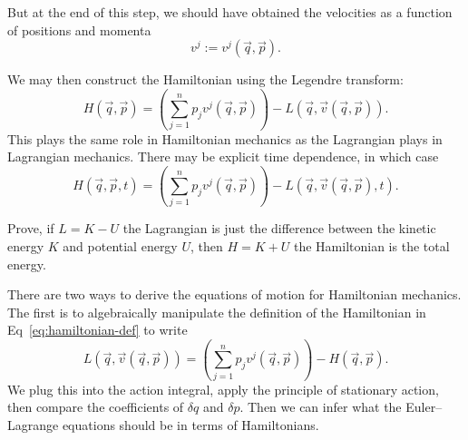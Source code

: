 But at the end of this step, we should have obtained the velocities as a
function of positions and momenta
\begin{equation}
v^{j} := v^{j}(\vec{q},\vec{p}).
\end{equation}

We may then construct the Hamiltonian using the Legendre transform:
\begin{equation}\label{eq:hamiltonian-def}
H(\vec{q},\vec{p}) = \left(\sum^{n}_{j=1}p_{j}v^{j}(\vec{q},\vec{p})\right) - L(\vec{q},\vec{v}(\vec{q},\vec{p})).
\end{equation}
This plays the same role in Hamiltonian mechanics as the Lagrangian
plays in Lagrangian mechanics. There may be explicit time dependence, in
which case
\begin{equation}
H(\vec{q},\vec{p},t) = \left(\sum^{n}_{j=1}p_{j}v^{j}(\vec{q},\vec{p})\right) - L(\vec{q},\vec{v}(\vec{q},\vec{p}),t).
\end{equation}

\begin{exercise}
Prove, if $L=K-U$ the Lagrangian is just the difference between the
kinetic energy $K$ and potential energy $U$, then $H=K+U$ the
Hamiltonian is the total energy.
\end{exercise}

There are two ways to derive the equations of motion for Hamiltonian
mechanics. The first is to algebraically manipulate the definition of
the Hamiltonian in Eq~\eqref{eq:hamiltonian-def} to write
\begin{equation}
L(\vec{q},\vec{v}(\vec{q},\vec{p})) = \left(\sum^{n}_{j=1}p_{j}v^{j}(\vec{q},\vec{p})\right) - H(\vec{q},\vec{p}).
\end{equation}
We plug this into the action integral, apply the principle of stationary
action, then compare the coefficients of $\delta q$ and $\delta p$. Then
we can infer what the Euler--Lagrange equations should be in terms of
Hamiltonians.

